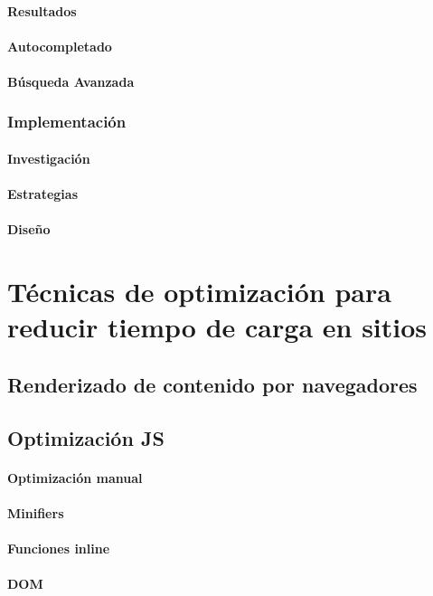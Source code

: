 \documentclass[12pt]{report}
\begin{document}
				\paragraph{Resultados}
				\paragraph{Autocompletado}
				\paragraph{Búsqueda Avanzada}
			\subsubsection{Implementación}
				\paragraph{Investigación}
				\paragraph{Estrategias}
				\paragraph{Diseño}
	\section{Técnicas de optimización para reducir tiempo de carga en sitios}
		\subsection{Renderizado de contenido por navegadores}
		\subsection{Optimización JS}
			\paragraph{Optimización manual}
			\paragraph{Minifiers}
			\paragraph{Funciones inline}
			\paragraph{DOM}
\end{document}
